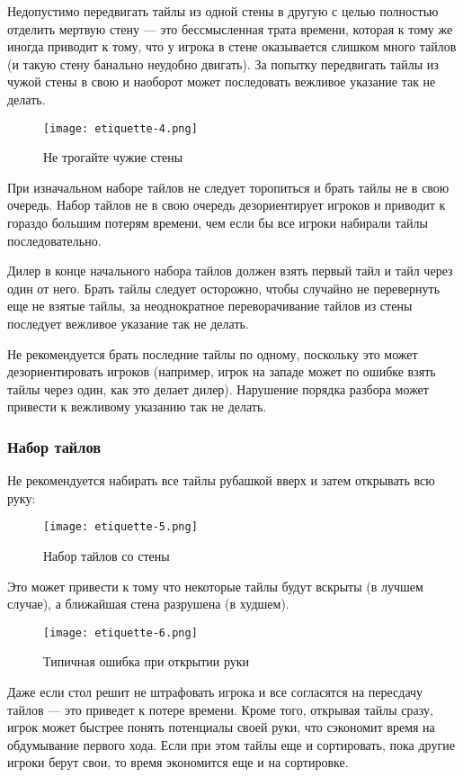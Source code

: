 Недопустимо передвигать тайлы из одной стены в другую с целью полностью отделить мертвую стену --- это бессмысленная трата времени, которая к тому же иногда приводит к тому, что у игрока в стене оказывается слишком много тайлов (и такую стену банально неудобно двигать). За попытку передвигать тайлы из чужой стены в свою и наоборот может последовать вежливое указание так не делать.

\begin{figure}[H]
	\centering
	\texttt{[image: etiquette-4.png]}
	\caption{Не трогайте чужие стены}
\end{figure}

При изначальном наборе тайлов не следует торопиться и брать тайлы не в свою очередь. Набор тайлов не в свою очередь дезориентирует игроков и приводит к гораздо большим потерям времени, чем если бы все игроки набирали тайлы последовательно.

Дилер в конце начального набора тайлов должен взять первый тайл и тайл через один от него. Брать тайлы следует осторожно, чтобы случайно не перевернуть еще не взятые тайлы, за неоднократное переворачивание тайлов из стены последует вежливое указание так не делать.

Не рекомендуется брать последние тайлы по одному, поскольку это может дезориентировать игроков (например, игрок на западе может по ошибке взять тайлы через один, как это делает дилер). Нарушение порядка разбора может привести к вежливому указанию так не делать.

\subsubsection{Набор тайлов}

Не рекомендуется набирать все тайлы рубашкой вверх и затем открывать всю руку:

\begin{figure}[H]
	\centering
	\texttt{[image: etiquette-5.png]}
	\caption{Набор тайлов со стены}
\end{figure}

Это может привести к тому что некоторые тайлы будут вскрыты (в лучшем случае), а ближайшая стена разрушена (в худшем).

\begin{figure}[H]
	\centering
	\texttt{[image: etiquette-6.png]}
	\caption{Типичная ошибка при открытии руки}
\end{figure}

Даже если стол решит не штрафовать игрока и все согласятся на пересдачу тайлов --- это приведет к потере времени. Кроме того, открывая тайлы сразу, игрок может быстрее понять потенциалы своей руки, что сэкономит время на обдумывание первого хода. Если при этом тайлы еще и сортировать, пока другие игроки берут свои, то время экономится еще и на сортировке.

